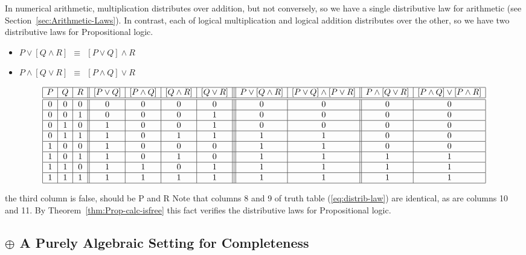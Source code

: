\noindent
In numerical arithmetic, multiplication distributes over addition, but
not conversely, so we have a single distributive law for arithmetic
(see Section~\ref{sec:Arithmetic-Laws}).  In contrast, each of logical
multiplication and logical addition distributes over the other, so we
have two distributive laws for Propositional logic.
\begin{itemize}
\item
$ P \vee [ Q \wedge R] \ \ \equiv \ \ [P \vee Q] \wedge R$
\item
$P \wedge [ Q \vee R] \ \ \equiv \ \ [P \wedge Q] \vee R$
\end{itemize}
{\small
\begin{equation}
\label{eq:distrib-law}
\begin{array}{|c|c|c||c|c|c|c|||c|c||c|c|}
\hline
P & Q & R
  & [P \vee Q]
  & [P \wedge Q]
  & [Q \wedge R] 
  & [Q \vee R] 
  & P \vee [ Q \wedge R]
  & [P \vee Q] \wedge [P \vee R]
  & P \wedge [ Q \vee R]
  & [P \wedge Q] \vee [P \wedge R] \\
\hline
\hline
0 & 0 & 0
  & 0
  & 0
  & 0
  & 0
  & 0
  & 0
  & 0
  & 0 \\ 
\hline
0 & 0 & 1
  & 0
  & 0
  & 0
  & 1
  & 0
  & 0
  & 0 
  & 0 \\
\hline
0 & 1 & 0
  & 1
  & 0
  & 0
  & 1
  & 0
  & 0
  & 0
  & 0 \\
\hline
0 & 1 & 1
  & 1
  & 0
  & 1
  & 1
  & 1
  & 1
  & 0
  & 0 \\
\hline
1 & 0 & 0
  & 1
  & 0
  & 0
  & 0
  & 1
  & 1
  & 0
  & 0 \\
\hline
1 & 0 & 1
  & 1
  & 0
  & 1
  & 0
  & 1
  & 1
  & 1
  & 1 \\
\hline
1 & 1 & 0
  & 1
  & 1
  & 0
  & 1
  & 1
  & 1
  & 1
  & 1 \\
\hline
1 & 1 & 1
  & 1
  & 1
  & 1
  & 1
  & 1
  & 1
  & 1
  & 1 \\
\hline
\end{array}
\end{equation}
}

{\Denis the third column is false, should be P and R}
Note that columns 8 and 9 of truth table (\ref{eq:distrib-law}) are
identical, as are columns 10 and 11.  By
Theorem~\ref{thm:Prop-calc-isfree} this fact verifies the distributive
laws for Propositional logic.


\subsection{$\oplus$ A Purely Algebraic Setting for Completeness}

